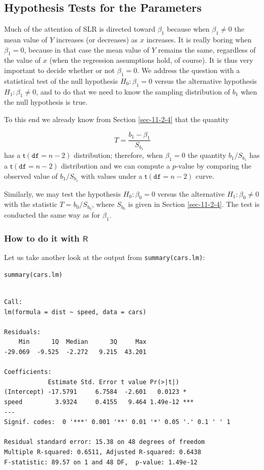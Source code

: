 \documentclass[captions=tableheading]{scrbook}
\begin{document}
\subsection{Hypothesis Tests for the Parameters}
\label{sec-11-3-1}
\label{sub-slr-hypoth-test-params}


Much of the attention of SLR is directed toward \(\beta_{1}\) because when \( \beta_{1}\neq 0 \) the mean value of \(Y\) increases (or decreases) as \(x\) increases. It is really boring when \(\beta_{1}=0\), because in that case the mean value of \(Y\) remains the same, regardless of the value of \(x\) (when the regression assumptions hold, of course). It is thus very important to decide whether or not \( \beta_{1} = 0 \). We address the question with a statistical test of the null hypothesis \(H_{0}:\beta_{1}=0\) versus the alternative hypothesis \(H_{1}:\beta_{1}\neq0\), and to do that we need to know the sampling distribution of \(b_{1}\) when the null hypothesis is true.

To this end we already know from Section \ref{sec-11-2-4} that the quantity

\begin{equation} 
T=\frac{b_{1}-\beta_{1}}{S_{b_{1}}}
\end{equation}
has a \(\mathsf{t}(\mathtt{df}=n-2)\) distribution; therefore, when \(\beta_{1}=0\) the quantity \(b_{1}/S_{b_{1}}\) has a \(\mathsf{t}(\mathtt{df}=n-2)\) distribution and we can compute a \(p\)-value by comparing the observed value of \(b_{1}/S{}_{b_{1}}\) with values under a \(\mathsf{t}(\mathtt{df}=n-2)\) curve. 

Similarly, we may test the hypothesis \(H_{0}:\beta_{0}=0\) versus the alternative \(H_{1}:\beta_{0}\neq0\) with the statistic \(T=b_{0}/S_{b_{0}}\), where \(S_{b_{0}}\) is given in Section \ref{sec-11-2-4}. The test is conducted the same way as for \(\beta_{1}\). 
\subsubsection{How to do it with \(\mathsf{R}\)}
\label{sec-11-3-1-1}


Let us take another look at the output from \texttt{summary(cars.lm)}:


\lstset{language=R}
\begin{lstlisting}
summary(cars.lm)
\end{lstlisting}


\begin{verbatim}

Call:
lm(formula = dist ~ speed, data = cars)

Residuals:
    Min      1Q  Median      3Q     Max 
-29.069  -9.525  -2.272   9.215  43.201 

Coefficients:
            Estimate Std. Error t value Pr(>|t|)    
(Intercept) -17.5791     6.7584  -2.601   0.0123 *  
speed         3.9324     0.4155   9.464 1.49e-12 ***
---
Signif. codes:  0 '***' 0.001 '**' 0.01 '*' 0.05 '.' 0.1 ' ' 1 

Residual standard error: 15.38 on 48 degrees of freedom
Multiple R-squared: 0.6511,	Adjusted R-squared: 0.6438 
F-statistic: 89.57 on 1 and 48 DF,  p-value: 1.49e-12
\end{verbatim}
\end{document}
